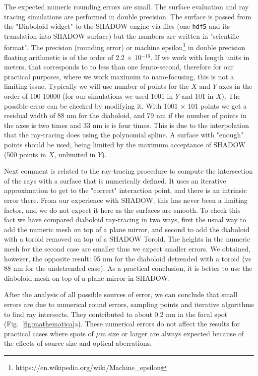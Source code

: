 \documentclass{iucr}              %
\newcommand{\inred}[1]{{\color{red}#1}}
\begin{document}

 
The expected numeric rounding errors are small. The surface evaluation and ray tracing simulations are performed in double precision. The surface is passed from the "Diaboloid widget" to the SHADOW engine via files (one {\tt hdf5} and its translation into SHADOW surface) but the numbers are written in "scientific format". The precision (rounding error) or machine epsilon\footnote{ https://en.wikipedia.org/wiki/Machine\_epsilon} in double precision floating arithmetic is of the order of 2.2 $\times$ 10$^{-16}$. If we work with length units in meters, that corresponds to to less than one femto-second, therefore for our practical purposes, where we work maximum to nano-focusing, this is not a limiting issue. Typically we will use number of points for the $X$ and $Y$ axes in the order of 100-10000 (for our simulations we used 1001 in $Y$ and 101 in $X$). The possible error can be checked by modifying it. With 1001 $\times$ 101 points we get a residual width of \inred{88 nm for the diaboloid, and 79 nm if the number of points in the axes is two times and 33 nm is is four times.} This is due to the interpolation that the ray-tracing does using the polynomial spline. A surface with "enough" points should be used, being limited by the maximum acceptance of SHADOW (500 points in $X$, unlimited in $Y$). 

Next comment is related to the ray-tracing procedure to compute the intersection of the rays with a surface that is numerically defined. It uses an iterative approximation to get to the "correct" interaction point, and there is an intrinsic error there. From our experience with SHADOW, this has never been a limiting factor, and we do not expect it here as the surfaces are smooth. To check this fact we have compared  diaboloid ray-tracing in two ways, first the usual way to add the numeric mesh on top of a plane mirror, and second to add the diaboloid with a toroid removed on top of a SHADOW Toroid. The heights in the numeric mesh for the second case are smaller thus we expect smaller errors. \inred{We obtained, however, the opposite result: 95 nm for the diaboloid detrended with a toroid (vs 88 nm for the undetrended case).} As a practical conclusion, it is better to use the diaboloid mesh on top of a plane mirror in SHADOW.

\inred{After the analysis of all possible sources of error, we can conclude that small errors are due to numerical round errors, sampling points and iterative algorithms to find ray intersects. They contributed to about 0.2 nm in the focal spot (Fig.~\ref{fig:mathematica}a).}
These numerical errors do not affect the results for practical cases where spots of $\mu$m size or larger are always expected because of the effects of source size and optical aberrations. 
\end{document}
